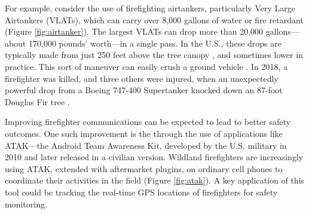 \documentclass[]             %
{NASA}                       %
\theoremstyle{definition}
\begin{document}
For example, consider the use of firefighting airtankers, particularly
Very Large Airtankers (VLATs), which can carry over 8,000 gallons of
water or fire retardant \cite{2019:airtankerops}
(Figure \ref{fig:airtanker}). The largest VLATs can drop more than
20,000 gallons---about 170,000 pounds' worth---in a single pass. In
the U.S., these drops are typically made from just 250 feet above the
tree canopy \cite{2019:airtankerops}, and sometimes lower in
practice. This sort of maneuver can easily crush a ground vehicle
\cite{2019:stickney}. In 2018, a firefighter was killed, and three
others were injured, when an unexpectedly powerful drop from a Boeing
747-400 Supertanker knocked down an 87-foot Douglas Fir tree
\cite{2018:calfire}.

Improving firefighter communications can be expected to lead to better
safety outcomes. One such improvement is the through the use of
applications like ATAK---the Android Team Awareness Kit, developed by
the U.S. military in 2010 and later released in a civilian
version. Wildland firefighters are increasingly using ATAK, extended
with aftermarket plugins, on ordinary cell phones to coordinate their
activities in the field (Figure \ref{fig:atak}). A key application of
this tool could be tracking the real-time GPS locations of
firefighters for safety monitoring.
\end{document}
